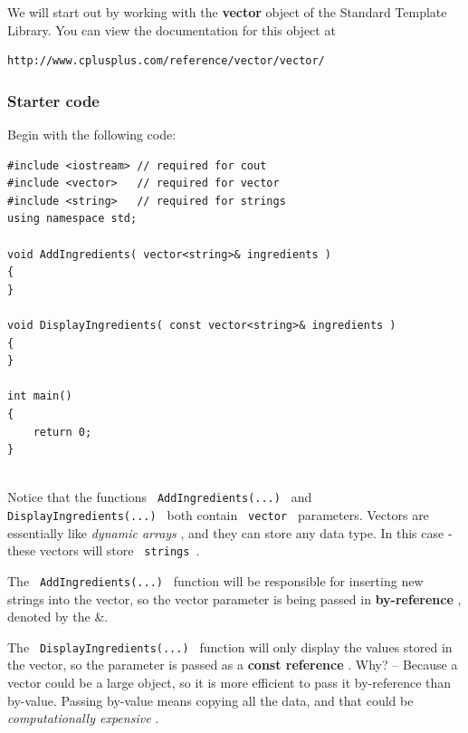 \documentclass[a4paper,12pt]{book}
\begin{document}
                We will start out by working with the \textbf{ vector } object
                of the Standard Template Library.  You can view the documentation
                for this object at
\begin{verbatim}
http://www.cplusplus.com/reference/vector/vector/ 
\end{verbatim}
                \hrulefill{}
                \subsubsection*{ Starter code }
                    Begin with the following code:

\begin{lstlisting}[style=code]
#include <iostream> // required for cout
#include <vector>   // required for vector
#include <string>   // required for strings
using namespace std;

void AddIngredients( vector<string>& ingredients )
{
}

void DisplayIngredients( const vector<string>& ingredients )
{
}

int main()
{ 
    return 0;
}
\end{lstlisting}

                    ~\\
                    Notice that the functions \texttt{ AddIngredients(...) }
                    and \texttt{ DisplayIngredients(...) } both contain
                    \texttt{ vector } parameters. Vectors are essentially
                    like \textit{ dynamic arrays }, and they can store any
                    data type. In this case - these vectors will store
                    \texttt{ strings }.

                    The \texttt{ AddIngredients(...) } function will be responsible
                    for inserting new strings into the vector, so the
                    vector parameter is being passed in \textbf{ by-reference },
                    denoted by the \&.

                    The \texttt{ DisplayIngredients(...) } function will only
                    display the values stored in the vector, so the parameter
                    is passed as a \textbf{ const reference }. Why?
                    -- Because a vector could be a large object, so it is
                    more efficient to pass it by-reference than by-value.
                    Passing by-value means copying all the data, and that could
                    be \textit{ computationally expensive }.
\end{document}
